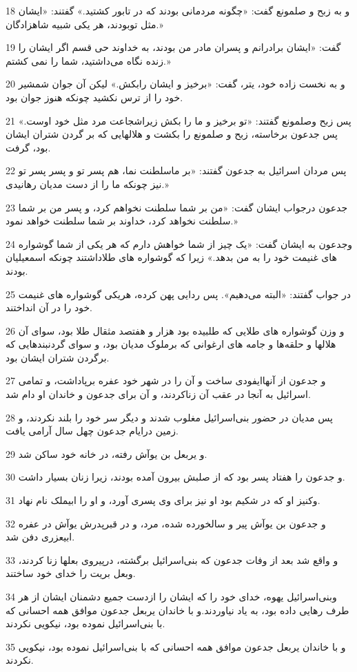 \par 18 و به زبح و صلمونع گفت: «چگونه مردمانی بودند که در تابور کشتید.» گفتند: «ایشان مثل توبودند، هر یکی شبیه شاهزادگان.»
\par 19 گفت: «ایشان برادرانم و پسران مادر من بودند، به خداوند حی قسم اگر ایشان را زنده نگاه می‌داشتید، شما را نمی کشتم.»
\par 20 و به نخست زاده خود، یتر، گفت: «برخیز و ایشان رابکش.» لیکن آن جوان شمشیر خود را از ترس نکشید چونکه هنوز جوان بود. 
\par 21 پس زبح وصلمونع گفتند: «تو برخیز و ما را بکش زیراشجاعت مرد مثل خود اوست.» پس جدعون برخاسته، زبح و صلمونع را بکشت و هلالهایی که بر گردن شتران ایشان بود، گرفت.
\par 22 پس مردان اسرائیل به جدعون گفتند: «بر ماسلطنت نما، هم پسر تو و پسر پسر تو نیز چونکه ما را از دست مدیان رهانیدی.»
\par 23 جدعون درجواب ایشان گفت: «من بر شما سلطنت نخواهم کرد، و پسر من بر شما سلطنت نخواهد کرد، خداوند بر شما سلطنت خواهد نمود.»
\par 24 وجدعون به ایشان گفت: «یک چیز از شما خواهش دارم که هر یکی از شما گوشواره های غنیمت خود را به من بدهد.» زیرا که گوشواره های طلاداشتند چونکه اسمعیلیان بودند.
\par 25 در جواب گفتند: «البته می‌دهیم». پس ردایی پهن کرده، هریکی گوشواره های غنیمت خود را در آن انداختند.
\par 26 و وزن گوشواره های طلایی که طلبیده بود هزار و هفتصد مثقال طلا بود، سوای آن هلالها و حلقه‌ها و جامه های ارغوانی که برملوک مدیان بود، و سوای گردنبندهایی که برگردن شتران ایشان بود.
\par 27 و جدعون از آنهاایفودی ساخت و آن را در شهر خود عفره برپاداشت، و تمامی اسرائیل به آنجا در عقب آن زناکردند، و آن برای جدعون و خاندان او دام شد.
\par 28 پس مدیان در حضور بنی‌اسرائیل مغلوب شدند و دیگر سر خود را بلند نکردند، و زمین درایام جدعون چهل سال آرامی یافت.
\par 29 و یربعل بن یوآش رفته، در خانه خود ساکن شد.
\par 30 و جدعون را هفتاد پسر بود که از صلبش بیرون آمده بودند، زیرا زنان بسیار داشت.
\par 31 وکنیز او که در شکیم بود او نیز برای وی پسری آورد، و او را ابیملک نام نهاد.
\par 32 و جدعون بن یوآش پیر و سالخورده شده، مرد، و در قبرپدرش یوآش در عفره ابیعزری دفن شد.
\par 33 و واقع شد بعد از وفات جدعون که بنی‌اسرائیل برگشته، در‌پیروی بعلها زنا کردند، وبعل بریت را خدای خود ساختند.
\par 34 وبنی‌اسرائیل یهوه، خدای خود را که ایشان را ازدست جمیع دشمنان ایشان از هر طرف رهایی داده بود، به یاد نیاوردند.و با خاندان یربعل جدعون موافق همه احسانی که با بنی‌اسرائیل نموده بود، نیکویی نکردند.
\par 35 و با خاندان یربعل جدعون موافق همه احسانی که با بنی‌اسرائیل نموده بود، نیکویی نکردند.
 
